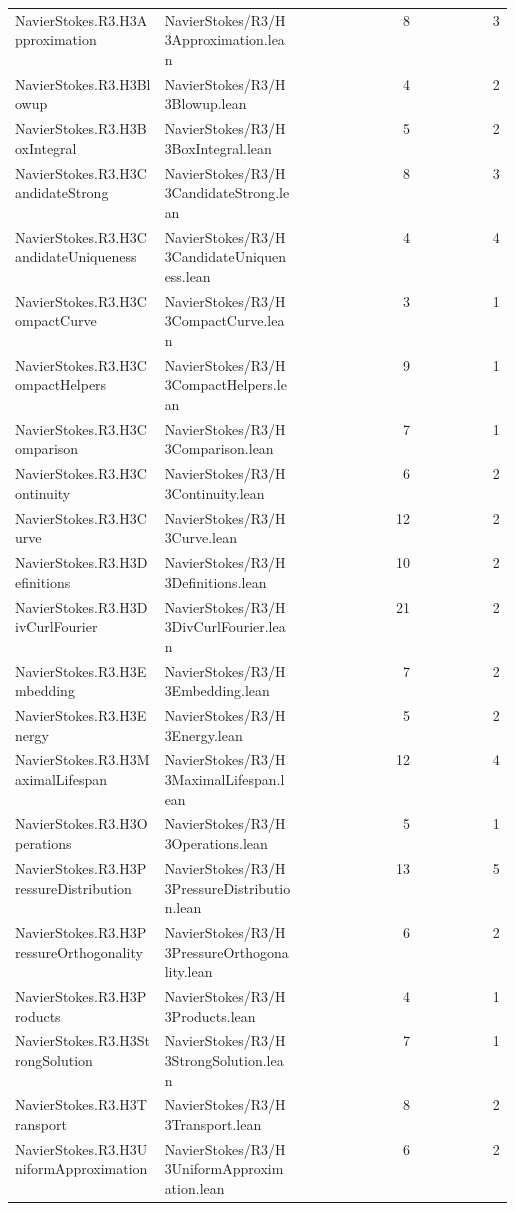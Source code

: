 \begin{longtable}{p{0.30\linewidth}p{0.28\linewidth}rr}
NavierStokes.R3.H3Approximation & NavierStokes/R3/H3Approximation.lean & 8 & 3\\
NavierStokes.R3.H3Blowup & NavierStokes/R3/H3Blowup.lean & 4 & 2\\
NavierStokes.R3.H3BoxIntegral & NavierStokes/R3/H3BoxIntegral.lean & 5 & 2\\
NavierStokes.R3.H3CandidateStrong & NavierStokes/R3/H3CandidateStrong.lean & 8 & 3\\
NavierStokes.R3.H3CandidateUniqueness & NavierStokes/R3/H3CandidateUniqueness.lean & 4 & 4\\
NavierStokes.R3.H3CompactCurve & NavierStokes/R3/H3CompactCurve.lean & 3 & 1\\
NavierStokes.R3.H3CompactHelpers & NavierStokes/R3/H3CompactHelpers.lean & 9 & 1\\
NavierStokes.R3.H3Comparison & NavierStokes/R3/H3Comparison.lean & 7 & 1\\
NavierStokes.R3.H3Continuity & NavierStokes/R3/H3Continuity.lean & 6 & 2\\
NavierStokes.R3.H3Curve & NavierStokes/R3/H3Curve.lean & 12 & 2\\
NavierStokes.R3.H3Definitions & NavierStokes/R3/H3Definitions.lean & 10 & 2\\
NavierStokes.R3.H3DivCurlFourier & NavierStokes/R3/H3DivCurlFourier.lean & 21 & 2\\
NavierStokes.R3.H3Embedding & NavierStokes/R3/H3Embedding.lean & 7 & 2\\
NavierStokes.R3.H3Energy & NavierStokes/R3/H3Energy.lean & 5 & 2\\
NavierStokes.R3.H3MaximalLifespan & NavierStokes/R3/H3MaximalLifespan.lean & 12 & 4\\
NavierStokes.R3.H3Operations & NavierStokes/R3/H3Operations.lean & 5 & 1\\
NavierStokes.R3.H3PressureDistribution & NavierStokes/R3/H3PressureDistribution.lean & 13 & 5\\
NavierStokes.R3.H3PressureOrthogonality & NavierStokes/R3/H3PressureOrthogonality.lean & 6 & 2\\
NavierStokes.R3.H3Products & NavierStokes/R3/H3Products.lean & 4 & 1\\
NavierStokes.R3.H3StrongSolution & NavierStokes/R3/H3StrongSolution.lean & 7 & 1\\
NavierStokes.R3.H3Transport & NavierStokes/R3/H3Transport.lean & 8 & 2\\
NavierStokes.R3.H3UniformApproximation & NavierStokes/R3/H3UniformApproximation.lean & 6 & 2\\

\end{longtable}
